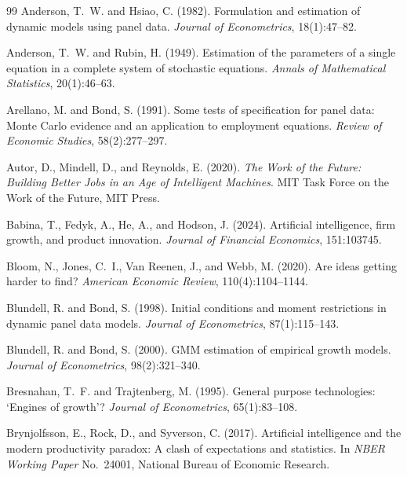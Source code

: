 \documentclass[11pt,a4paper]{article}
\begin{document}
\begin{thebibliography}{99}
Anderson, T.~W. and Hsiao, C. (1982).
\newblock Formulation and estimation of dynamic models using panel data.
\newblock \emph{Journal of Econometrics}, 18(1):47--82.

Anderson, T.~W. and Rubin, H. (1949).
\newblock Estimation of the parameters of a single equation in a complete system of stochastic equations.
\newblock \emph{Annals of Mathematical Statistics}, 20(1):46--63.

Arellano, M. and Bond, S. (1991).
\newblock Some tests of specification for panel data: Monte Carlo evidence and an application to employment equations.
\newblock \emph{Review of Economic Studies}, 58(2):277--297.

Autor, D., Mindell, D., and Reynolds, E. (2020).
\newblock \emph{The Work of the Future: Building Better Jobs in an Age of Intelligent Machines}.
\newblock MIT Task Force on the Work of the Future, MIT Press.

Babina, T., Fedyk, A., He, A., and Hodson, J. (2024).
\newblock Artificial intelligence, firm growth, and product innovation.
\newblock \emph{Journal of Financial Economics}, 151:103745.

Bloom, N., Jones, C.~I., Van Reenen, J., and Webb, M. (2020).
\newblock Are ideas getting harder to find?
\newblock \emph{American Economic Review}, 110(4):1104--1144.

Blundell, R. and Bond, S. (1998).
\newblock Initial conditions and moment restrictions in dynamic panel data models.
\newblock \emph{Journal of Econometrics}, 87(1):115--143.

Blundell, R. and Bond, S. (2000).
\newblock GMM estimation of empirical growth models.
\newblock \emph{Journal of Econometrics}, 98(2):321--340.

Bresnahan, T.~F. and Trajtenberg, M. (1995).
\newblock General purpose technologies: `Engines of growth'?
\newblock \emph{Journal of Econometrics}, 65(1):83--108.

Brynjolfsson, E., Rock, D., and Syverson, C. (2017).
\newblock Artificial intelligence and the modern productivity paradox: A clash of expectations and statistics.
\newblock In \emph{NBER Working Paper} No.~24001, National Bureau of Economic Research.


\end{thebibliography}
\end{document}
